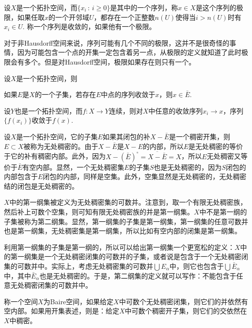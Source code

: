 \begin{para}
	设$X$是一个拓扑空间，而$\{x_i\,:\, i\geq 0\}$是其中的一个序列，称$x\in X$是这个序列的极限，如果任取$x$的一个开邻域$U$，都存在一个正整数$n(U)$使得当$i>n(U)$时有$x_i\in U$. 称一个序列是收敛的，如果他有一个极限。

	对于非Hausdorff空间来说，序列可能有几个不同的极限，这并不是很奇怪的事情，因为可能包含一个点的开集一定包含着另一点，从极限的定义就知道了此时极限会有多个。但是对Hausdorff空间，极限如果存在则只有一个。
\end{para}

\begin{lem}
设$X$是一个拓扑空间，则
\begin{compactenum}[(a)]
\item 如果$E$是$X$的一个子集，若存在$E$中点的序列收敛于$x$，则$x\in \bar{E}$.
\item 设$Y$也是一个拓扑空间，而$f:X\to Y$连续，则对$X$中任意的收敛序列$x_i\to x$，序列$\{f(x_i)\}$收敛于$f(x)$.
\end{compactenum}
\end{lem}

\begin{para}
设$X$是一个拓扑空间，它的子集$E$如果其闭包的补$X-\bar{E}$是一个稠密开集，则$E\subset X$被称为无处稠密的。由于$X-\bar{E}$是$X-E$的内部，所以$E$是无处稠密的等价于它的补有稠密内部。此外，因为$X-(\bar{E})^\circ=\overline{X-\bar{E}}=X$，所以$E$无处稠密又等价于$\bar{E}$有空内部。显然，一个无处稠密集$E$的子集$S$也是无处稠密的，因为$S$闭包的内部包含于$E$闭包的内部，同样是空集。此外，空集显然是无处稠密的，无处稠密结的闭包是无处稠密的。

$X$中的第一纲集被定义为无处稠密集的可数并。注意到，取一个有限无处稠密族，然后补上可数个空集，则可知有限无处稠密族的并是第一纲集。$X$中不是第一纲的子集被称为第二纲集。显然，第一纲集的子集是第一纲集，第一纲集的任意可数并也是第一纲集，无处稠密集是第一纲集，所以比如有空内部的闭集是第一纲集。

利用第一纲集的子集是第一纲的，所以可以给出第一纲集一个更宽松的定义：$X$中的第一纲集是一个无处稠密闭集的可数并的子集，或者说是包含于一个无处稠密闭集的可数并中。实际上，考虑无处稠密集的可数并$\bigcup E_\alpha$中，则它也包含于$\bigcup \bar{E}_\alpha$中，其中$\bar{E}_\alpha$也是无处稠密的。于是，第二纲集的定义就可以写作：不能包含于任意无处稠密闭集的可数并中。

称一个空间$X$为Baire空间，如果给定$X$中可数个无处稠密闭集，则它们的并依然有空内部。如果用开集表述，则是：给定$X$中可数个稠密开子集，则它们的交依然在$X$中稠密。
\end{para}

